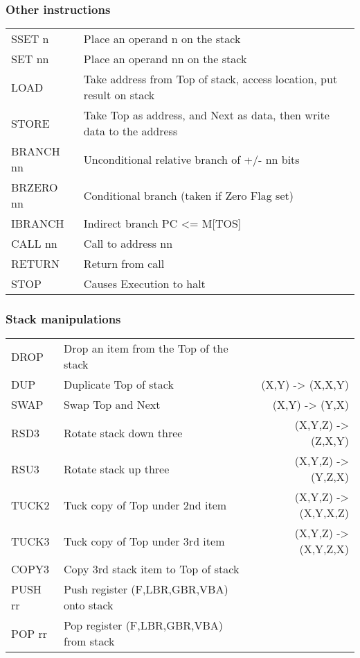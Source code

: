 \subsubsection{Other instructions}
\begingroup
\ttfamily
\begin{tabularx}{0.95\textwidth}{l >{\raggedright\arraybackslash}X}
  SSET n & Place an operand n on the stack \\
  SET nn & Place an operand nn on the stack \\
  LOAD & Take address from Top of stack, access location, put result on stack \\
  STORE & Take Top as address, and Next as data, then write data to the address
  \\
  BRANCH nn & Unconditional relative branch of +/- nn bits \\
  BRZERO nn & Conditional branch (taken if Zero Flag set) \\
  IBRANCH & Indirect branch PC <= M[TOS] \\
  CALL nn & Call to address nn \\
  RETURN & Return from call \\
  STOP & Causes Execution to halt \\
\end{tabularx}
\endgroup

\subsubsection{Stack manipulations}
\begingroup
\ttfamily
\begin{tabularx}{\textwidth}{l X r}
  DROP & Drop an item from the Top of the stack & \\
  DUP & Duplicate Top of stack & (X,Y) -> (X,X,Y) \\
  SWAP & Swap Top and Next & (X,Y) -> (Y,X) \\
  RSD3 & Rotate stack down three & (X,Y,Z) -> (Z,X,Y) \\
  RSU3 & Rotate stack up three & (X,Y,Z) -> (Y,Z,X) \\
  TUCK2 & Tuck copy of Top under 2nd item & (X,Y,Z) -> (X,Y,X,Z) \\
  TUCK3 & Tuck copy of Top under 3rd item & (X,Y,Z) -> (X,Y,Z,X) \\
  COPY3 & Copy 3rd stack item to Top of stack & \\
  PUSH rr & Push register (F,LBR,GBR,VBA) onto stack & \\
  POP rr & Pop register (F,LBR,GBR,VBA) from stack & \\
\end{tabularx}
\endgroup

